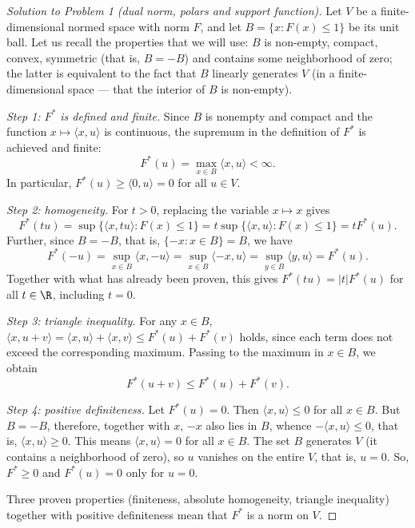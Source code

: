\documentclass[a4paper,12pt]{report}
\begin{document}
\begin{proof}[Solution to Problem \textup{1} \textup{(}dual norm, polars and support function\textup{)}]

Let $V$ be a finite-dimensional normed space with norm $F$, and let $B=\{x: F(x)\le1\}$ be its unit ball. Let us recall the properties that we will use: $B$ is non-empty, compact, convex, symmetric \textup{(}that is, $B=-B$\textup{)} and contains some neighborhood of zero; the latter is equivalent to the fact that $B$ linearly generates $V$ \textup{(}in a finite-dimensional space --- that the interior of $B$ is non-empty\textup{)}.

\textit{Step \textup{1}\textup{:} $F^*$ is defined and finite.} Since $B$ is nonempty and compact and the function $x\mapsto\langle x,u\rangle$ is continuous, the supremum in the definition of $F^*$ is achieved and finite\textup{:}
\[
F^*(u)=\max_{x\in B}\langle x,u\rangle<\infty .
\]
In particular, $F^*(u)\ge\langle0,u\rangle=0$ for all $u\in V$.

\textit{Step \textup{2}\textup{:} homogeneity.} For $t>0$, replacing the variable $x\mapsto x$ gives
\[
F^*(tu)=\sup\{\langle x,tu\rangle: F(x)\le1\}=t\sup\{\langle x,u\rangle: F(x)\le1\}=tF^*(u).
\]
Further, since $B=-B$, that is, $\{-x: x\in B\}=B$, we have
\[
F^*(-u)=\sup_{x\in B}\langle x,-u\rangle=\sup_{x\in B}\langle -x,u\rangle=\sup_{y\in B}\langle y,u\rangle=F^*(u).
\]
Together with what has already been proven, this gives $F^*(tu)=|t|F^*(u)$ for all $t\in\R$, including $t=0$.

\textit{Step \textup{3}\textup{:} triangle inequality.} For any $x\in B$, $\langle x,u+v\rangle=\langle x,u\rangle+\langle x,v\rangle\le F^*(u)+F^*(v)$ holds, since each term does not exceed the corresponding maximum. Passing to the maximum in $x\in B$, we obtain
\[
F^*(u+v)\le F^*(u)+F^*(v).
\]

\textit{Step \textup{4}\textup{:} positive definiteness.} Let $F^*(u)=0$. Then $\langle x,u\rangle\le0$ for all $x\in B$. But $B=-B$, therefore, together with $x$, $-x$ also lies in $B$, whence $-\langle x,u\rangle\le0$, that is, $\langle x,u\rangle\ge0$. This means $\langle x,u\rangle=0$ for all $x\in B$. The set $B$ generates $V$ \textup{(}it contains a neighborhood of zero\textup{)}, so $u$ vanishes on the entire $V$, that is, $u=0$. So, $F^*\ge0$ and $F^*(u)=0$ only for $u=0$.

Three proven properties \textup{(}finiteness, absolute homogeneity, triangle inequality\textup{)} together with positive definiteness mean that $F^*$ is a norm on $V$.


\end{proof}
\end{document}
